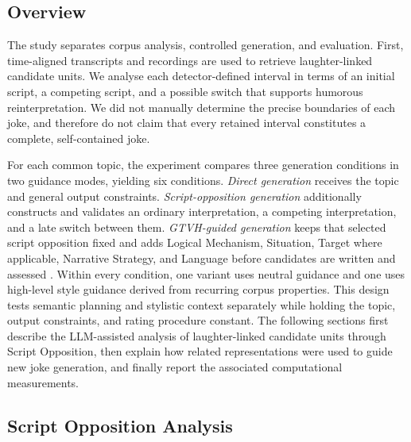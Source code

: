 \documentclass[11pt]{article}
\begin{document}
\subsection{Overview}\label{overview}

The study separates corpus analysis, controlled generation, and evaluation. First, time-aligned transcripts and recordings are used to retrieve laughter-linked candidate units. We analyse each detector-defined interval in terms of an initial script, a competing script, and a possible switch that supports humorous reinterpretation. We did not manually determine the precise boundaries of each joke, and therefore do not claim that every retained interval constitutes a complete, self-contained joke.

 For each common topic, the experiment compares three generation conditions in two guidance modes, yielding six conditions. \emph{Direct generation} receives the topic and general output constraints. \emph{Script-opposition generation} additionally constructs and validates an ordinary interpretation, a competing interpretation, and a late switch between them. \emph{GTVH-guided generation} keeps that selected script opposition fixed and adds Logical Mechanism, Situation, Target where applicable, Narrative Strategy, and Language before candidates are written and assessed \citep{attardo1991}. Within every condition, one variant uses neutral guidance and one uses high-level style guidance derived from recurring corpus properties. This design tests semantic planning and stylistic context separately while holding the topic, output constraints, and rating procedure constant. The following sections first describe the LLM-assisted analysis of laughter-linked candidate units through Script Opposition, then explain how related representations were used to guide new joke generation, and finally report the associated computational measurements.

\subsection{Script Opposition Analysis}\label{script-opposition-analysis}
\end{document}
